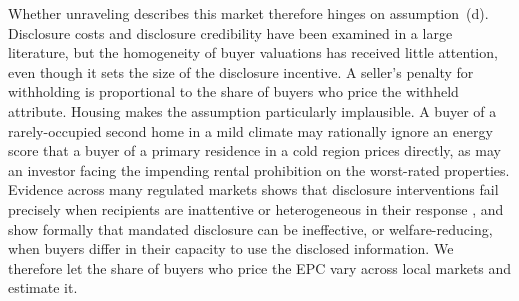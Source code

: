 Whether unraveling describes this market therefore hinges on assumption~(d).
Disclosure costs and disclosure credibility have been examined in a large literature, but
the homogeneity of buyer valuations has received little attention, even though it sets the size of
the disclosure incentive. A seller's penalty for withholding is proportional to the share of
buyers who price the withheld attribute. Housing makes the
assumption particularly implausible. A buyer of a rarely-occupied second home in a mild climate
may rationally ignore an energy score that a buyer of a primary residence in a cold region
prices directly, as may an investor facing the impending rental prohibition on the worst-rated
properties. Evidence across many regulated markets shows that disclosure interventions fail
precisely when recipients are inattentive or heterogeneous in their response
\citep{loewenstein_disclosure_2014, benshahar_failure_2011}, and
\citet{fishman_mandatory_2003} show formally that mandated disclosure can be ineffective, or
welfare-reducing, when buyers differ in their capacity to use the disclosed information. We
therefore let the share of buyers who price the EPC vary across local markets and estimate it.

